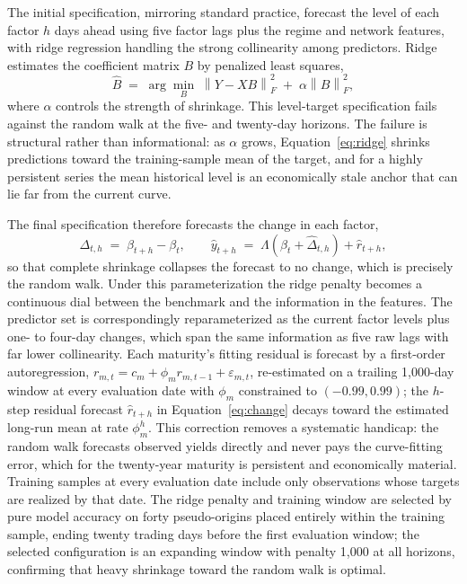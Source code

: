 \documentclass[10pt]{article}
\begin{document}
The initial specification, mirroring standard practice, forecast the level of each factor $h$ days ahead using five factor lags plus the regime and network features, with ridge regression \cite{hoerl1970} handling the strong collinearity among predictors. Ridge estimates the coefficient matrix $B$ by penalized least squares,
\begin{equation}
\hat{B} \;=\; \arg\min_{B} \; \left\| Y - XB \right\|_F^2 \;+\; \alpha \left\| B \right\|_F^2,
\label{eq:ridge}
\end{equation}
where $\alpha$ controls the strength of shrinkage. This level-target specification fails against the random walk at the five- and twenty-day horizons. The failure is structural rather than informational: as $\alpha$ grows, Equation~\ref{eq:ridge} shrinks predictions toward the training-sample mean of the target, and for a highly persistent series the mean historical level is an economically stale anchor that can lie far from the current curve.

The final specification therefore forecasts the change in each factor,
\begin{equation}
\Delta_{t,h} \;=\; \beta_{t+h} - \beta_{t}, \qquad \hat{y}_{t+h} \;=\; \Lambda\left(\beta_t + \hat{\Delta}_{t,h}\right) + \hat{r}_{t+h},
\label{eq:change}
\end{equation}
so that complete shrinkage collapses the forecast to no change, which is precisely the random walk. Under this parameterization the ridge penalty becomes a continuous dial between the benchmark and the information in the features. The predictor set is correspondingly reparameterized as the current factor levels plus one- to four-day changes, which span the same information as five raw lags with far lower collinearity. Each maturity's fitting residual is forecast by a first-order autoregression, $r_{m,t} = c_m + \phi_m r_{m,t-1} + \varepsilon_{m,t}$, re-estimated on a trailing 1{,}000-day window at every evaluation date with $\phi_m$ constrained to $(-0.99, 0.99)$; the $h$-step residual forecast $\hat{r}_{t+h}$ in Equation~\ref{eq:change} decays toward the estimated long-run mean at rate $\phi_m^{h}$. This correction removes a systematic handicap: the random walk forecasts observed yields directly and never pays the curve-fitting error, which for the twenty-year maturity is persistent and economically material. Training samples at every evaluation date include only observations whose targets are realized by that date. The ridge penalty and training window are selected by pure model accuracy on forty pseudo-origins placed entirely within the training sample, ending twenty trading days before the first evaluation window; the selected configuration is an expanding window with penalty 1{,}000 at all horizons, confirming that heavy shrinkage toward the random walk is optimal.
\end{document}
